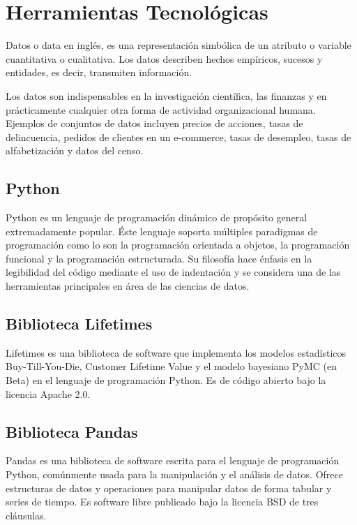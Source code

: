 \section{Herramientas Tecnológicas}

Datos o data en inglés, es una representación simbólica de un atributo o variable cuantitativa o cualitativa. Los datos describen hechos empíricos, sucesos y entidades, es decir, transmiten información. 

Los datos son indispensables en la investigación científica, las finanzas y en prácticamente cualquier otra forma de actividad organizacional humana. Ejemplos de conjuntos de datos incluyen precios de acciones, tasas de delincuencia, pedidos de clientes en un e-commerce, tasas de desempleo, tasas de alfabetización y datos del censo.
	
\subsection{Python}

Python es un lenguaje de programación dinámico de propósito general extremadamente popular. Éste lenguaje soporta múltiples paradigmas de programación como lo son la programación orientada a objetos, la programación funcional y la programación estructurada. Su filosofía hace énfasis en la legibilidad del código mediante el uso de indentación y se considera una de las herramientas principales en área de las ciencias de datos.
	
\subsection{Biblioteca Lifetimes}

Lifetimes es una biblioteca de software que implementa los modelos estadísticos Buy-Till-You-Die, Customer Lifetime Value y el modelo bayesiano PyMC (en Beta) en el lenguaje de programación Python. Es de código abierto bajo la licencia Apache 2.0.
	
\subsection{Biblioteca Pandas}

Pandas es una biblioteca de software escrita para el lenguaje de programación Python, comúnmente usada para la manipulación y el análisis de datos. Ofrece estructuras de datos y operaciones para manipular datos de forma tabular y series de tiempo. Es software libre publicado bajo la licencia BSD de tres cláusulas.
	
